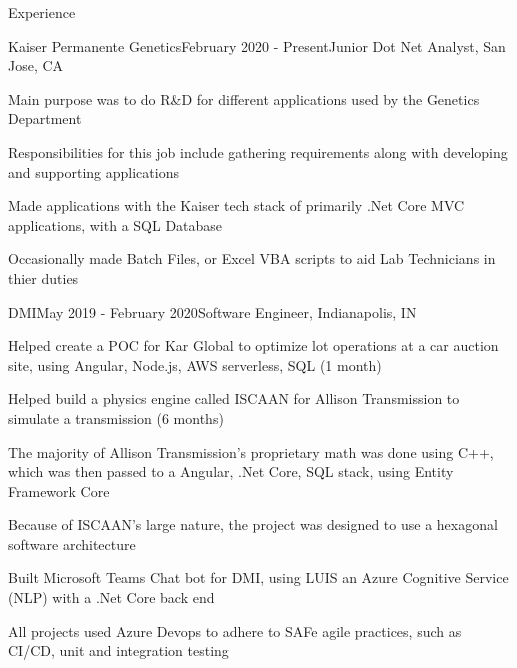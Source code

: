 \documentclass{resume} %
\begin{document}
\begin{rSection}{Experience}
\begin{rSubsection}{Kaiser Permanente Genetics}{February 2020 - Present}{Junior Dot Net Analyst, San Jose, CA}

\item Main purpose was to do R&D for different applications used by the Genetics Department
\item Responsibilities for this job include gathering requirements along with developing and supporting applications
\item Made applications with the Kaiser tech stack of primarily .Net Core MVC applications, with a SQL Database
\item Occasionally made Batch Files, or Excel VBA scripts to aid Lab Technicians in thier duties
\end{rSubsection}
\begin{rSubsection}{DMI}{May 2019 - February 2020}{Software Engineer, Indianapolis, IN}

\item Helped create a POC for Kar Global to optimize lot operations at a car auction site, using Angular, Node.js, AWS serverless, SQL (1 month)
\item Helped build a physics engine called ISCAAN for Allison Transmission to simulate a transmission (6 months)
\item The majority of Allison Transmission's proprietary math was done using C++, which was then passed to a Angular, .Net Core, SQL stack, using Entity Framework Core 
\item Because of ISCAAN's large nature, the project was designed to use a hexagonal software architecture
\item Built Microsoft Teams Chat bot for DMI, using LUIS an Azure Cognitive Service (NLP) with a .Net Core back end
\item All projects used Azure Devops to adhere to SAFe agile practices, such as CI/CD, unit and integration testing
\end{rSubsection}

\end{rSection}

\end{document}
